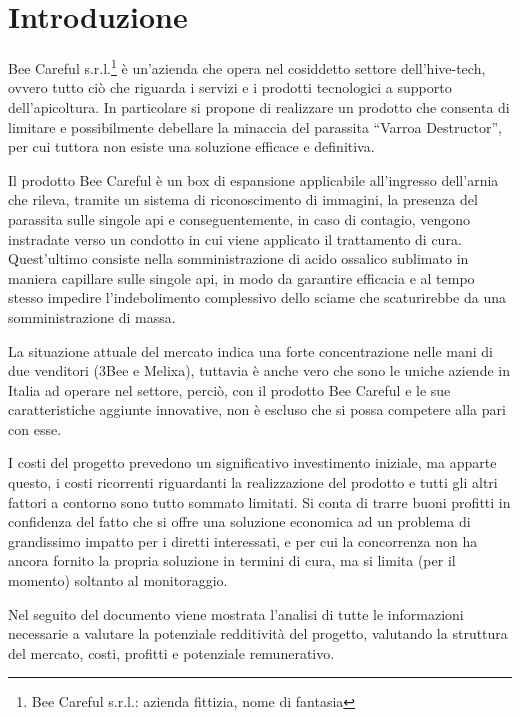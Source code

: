 \section{Introduzione}
Bee Careful s.r.l.\footnote{Bee Careful s.r.l.: azienda fittizia, nome di
fantasia} è un’azienda che opera nel cosiddetto settore dell’hive-tech, ovvero
tutto ciò che riguarda i servizi e i prodotti tecnologici a supporto
dell’apicoltura. In particolare si propone di realizzare un prodotto che
consenta di limitare e possibilmente debellare la minaccia del parassita “Varroa
Destructor”, per cui tuttora non esiste una soluzione efficace e definitiva.

Il prodotto Bee Careful è un box di espansione applicabile all’ingresso
dell’arnia che rileva, tramite un sistema di riconoscimento di immagini, la
presenza del parassita sulle singole api e conseguentemente, in caso di
contagio, vengono instradate verso un condotto in cui viene applicato il
trattamento di cura. Quest’ultimo consiste nella somministrazione di acido
ossalico sublimato in maniera capillare sulle singole api, in modo da garantire
efficacia e al tempo stesso impedire l’indebolimento complessivo dello sciame
che scaturirebbe da una  somministrazione di massa.

La situazione attuale del mercato indica una forte concentrazione nelle mani di
due venditori (3Bee e Melixa), tuttavia è anche vero che sono le uniche aziende
in Italia ad operare nel settore, perciò, con il prodotto Bee Careful e le sue
caratteristiche aggiunte innovative, non è escluso che si possa competere alla
pari con esse.

I costi del progetto prevedono un significativo investimento iniziale, ma
apparte questo, i costi ricorrenti riguardanti la realizzazione del prodotto e
tutti gli altri fattori a contorno sono tutto sommato limitati. Si conta di
trarre buoni profitti in confidenza del fatto che si offre una soluzione
economica ad un problema di grandissimo impatto per i diretti interessati, e per
cui la concorrenza non ha ancora fornito la propria soluzione in termini di
cura, ma si limita (per il momento) soltanto al monitoraggio.

Nel seguito del documento viene mostrata l’analisi di tutte le informazioni
necessarie a valutare la potenziale redditività del progetto, valutando la
struttura del mercato, costi, profitti e potenziale remunerativo.


